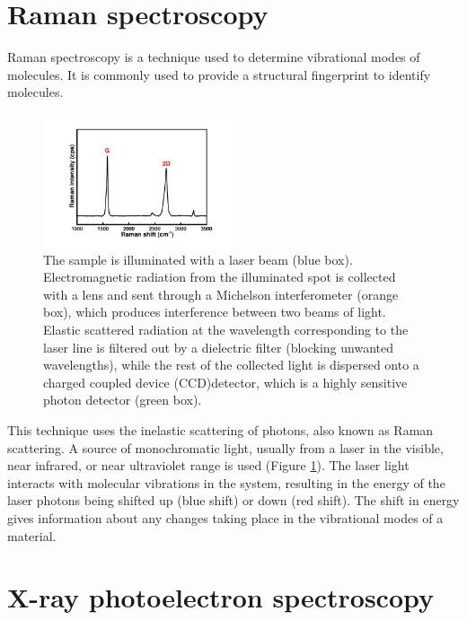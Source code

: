 \section{Raman spectroscopy}
Raman spectroscopy is a technique used to determine vibrational modes of molecules. It is commonly used to provide a structural fingerprint to identify molecules.

\begin{figure}[tbh!]
\centering
\includegraphics[width=0.5\textwidth]{Figures/chap2fig/Raman}
\caption{The sample is illuminated with a laser beam (blue box). Electromagnetic radiation from the illuminated spot is collected with a lens and sent through a Michelson interferometer (orange box), which produces interference between two beams of light. Elastic scattered radiation at the wavelength corresponding to the laser line is filtered out by a dielectric filter (blocking unwanted wavelengths), while the rest of the collected light is dispersed onto a charged coupled device (CCD)detector, which is a highly sensitive photon detector (green box).}
\label{Figures/chap2fig:Raman}
\end{figure}

This technique uses the inelastic scattering of photons, also known as Raman scattering. A source of monochromatic light, usually from a laser in the visible, near infrared, or near ultraviolet range is used (Figure \ref{Figures/chap2fig:Raman}). The laser light interacts with molecular vibrations in the system, resulting in the energy of the laser photons being shifted up (blue shift) or down (red shift). The shift in energy gives information about any changes taking place in the vibrational modes of a material. 

\section{X-ray photoelectron spectroscopy}

